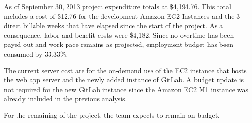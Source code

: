 
As of September 30, 2013 project expenditure totals at \$4,194.76. This total
includes a cost of \$12.76 for the development Amazon EC2 Instances and the 3
direct billable weeks that have elapsed since the start of the project. As a
consequence, labor and benefit costs were \$4,182. Since no overtime has been
payed out and work pace remains as projected, employment budget has been
consumed by 33.33\%.

The current server cost are for the on-demand use of the EC2 instance that hosts
the web app server and the newly added instance of GitLab. A budget update is
not required for the new GitLab instance since the Amazon EC2 M1 instance was
already included in the previous analysis.

For the remaining of the project, the team expects to remain on budget.
